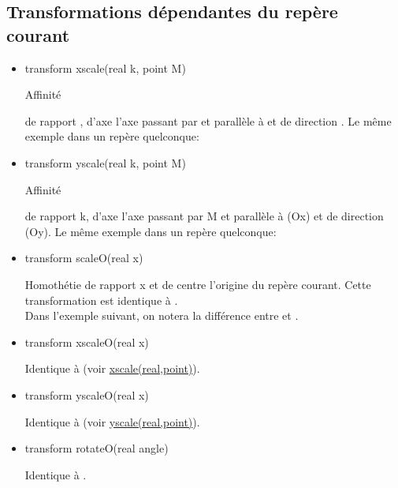 \documentclass[pdftex]{article}
\begin{document}
\subsection{Transformations dépendantes du repère courant}
\begin{itemize}
\item {}
  \begin{Vcolor}
    transform xscale(real k, point M)
  \end{Vcolor}
  \hypertarget{xscale(real,point)}{Affinité} de rapport , d'axe \og{}l'axe passant par  et parallèle à
  \fg{} et de direction .
  Le même exemple dans un repère quelconque:
\item {}
  \begin{Vcolor}
    transform yscale(real k, point M)
  \end{Vcolor}
  \hypertarget{yscale(real,point)}{Affinité} de rapport k, d'axe \og{}l'axe passant par M et parallèle à
  (Ox)\fg{} et de direction (Oy).
  Le même exemple dans un repère quelconque:
\item {}
  \begin{Vcolor}
    transform scaleO(real x)
  \end{Vcolor}
  Homothétie de rapport x et de centre \og{}l'origine du repère
  courant\fg{}. Cette transformation est identique à
  .\\
  Dans l'exemple suivant, on notera la différence entre
   et .
\item {}
  \begin{Vcolor}
    transform xscaleO(real x)
  \end{Vcolor}
  Identique à  (voir \href{#xscale(real,point)}{xscale(real,point)}).
\item {}
  \begin{Vcolor}
    transform yscaleO(real x)
  \end{Vcolor}
  Identique à  (voir \href{#yscale(real,point)}{yscale(real,point)}).
\item {}
  \begin{Vcolor}
    transform rotateO(real angle)
  \end{Vcolor}
  Identique à .
\end{itemize}
\end{document}
